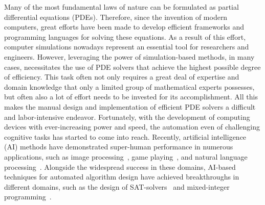 Many of the most fundamental laws of nature can be formulated as partial differential equations (PDEs).
Therefore, since the invention of modern computers, great efforts have been made to develop efficient frameworks and programming languages for solving these equations.
As a result of this effort, computer simulations nowadays represent an essential tool for researchers and engineers.
However, leveraging the power of simulation-based methods, in many cases, necessitates the use of PDE solvers that achieve the highest possible degree of efficiency.
This task often not only requires a great deal of expertise and domain knowledge that only a limited group of mathematical experts possesses, but often also a lot of effort needs to be invested for its accomplishment.
All this makes the manual design and implementation of efficient PDE solvers a difficult and labor-intensive endeavor.
Fortunately, with the development of computing devices with ever-increasing power and speed, the automation even of challenging cognitive tasks has started to come into reach.
Recently, artificial intelligence (AI) methods have demonstrated super-human performance in numerous applications, such as image processing~\cite{krizhevsky2017imagenet}, game playing~\cite{schrittwieser2020mastering,reed2022generalist}, and natural language processing~\cite{brown2020language}.
Alongside the widespread success in these domains, AI-based techniques for automated algorithm design have achieved breakthroughs in different domains, such as the design of SAT-solvers~\cite{khudabukhsh2016satenstein} and mixed-integer programming~\cite{hutter2010automated}.

